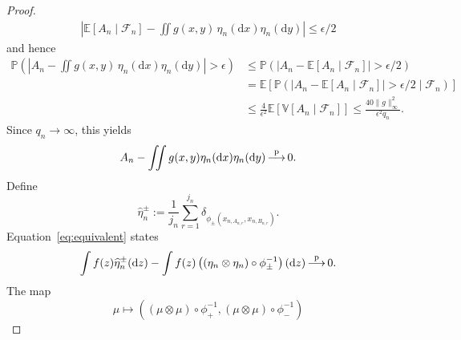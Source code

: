 \documentclass[10pt,a4paper]{amsart}
\newcommand{\Exb}[1]{\mathbb{E}\left[#1\right]}
\newcommand{\Prb}[1]{\mathbb{P}\left(#1\right)}
\newcommand{\Vab}[1]{\mathbb{V}\left[#1\right]}
\newcommand{\cF}{\mathcal{F}}
\newcommand{\convp}{\,{\buildrel \mathrm{p} \over \longrightarrow}\,}
\begin{document}
\begin{proof}
\begin{align*}
				\left| \Exb{A_n\mid\cF_n} -\iint g(x,y)\,\eta_n(\mathrm{d}x)\eta_n(\mathrm{d}y) \right| \le \epsilon/2
		\end{align*}
		and hence
		\begin{align*}
			\Prb{ \left| A_n- \iint g(x,y)\, \eta_n(\mathrm{d}x)\eta_n(\mathrm{d}y) \right|>\epsilon} &\le
			\Prb{ \left| A_n-\Exb{A_n\mid\cF_n} \right|>\epsilon/2 }\\
			&=\Exb{ \Prb{\left|A_n-\Exb{A_n\mid\cF_n}\right|>\epsilon/2\mid\cF_n}}\\
			&\le \frac{4}{\epsilon^2} \Exb{\Vab{A_n\mid\cF_n}} \le \frac{40\|g\|_\infty^2}{\epsilon^2q_n}.
		\end{align*}
		Since $q_n \to \infty$, this yields
		\begin{align}
			\label{eq:equivalent}
			A_n -  \iint g(x,y) \eta_n(\mathrm{d}x) \eta_n(\mathrm{d}y) \convp 0.
		\end{align}
		Define
		\[
			\widehat{\eta}_n^\pm := \frac{1}{j_n} \sum_{r=1}^{j_n} \delta_{\phi_\pm(x_{n,A_{n,r}},x_{n,B_{n,r}})}.
		\]
		Equation~\eqref{eq:equivalent} states
		\begin{align}
			\label{eq:tf}
			\int f(z)\widehat{\eta}_n^\pm(\mathrm{d}z) -  \int f(z) \left((\eta_n\otimes\eta_n)\circ\phi_\pm^{-1}\right)(\mathrm{d}z) \convp 0.
		\end{align}
		The map
		\[
			\mu \mapsto \left( (\mu\otimes\mu)\circ\phi_+^{-1}, (\mu\otimes\mu)\circ\phi_-^{-1}\right)
		\]

\end{proof}
\end{document}
